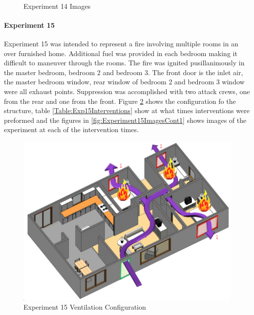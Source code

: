 \documentclass{article}
\begin{document}
\begin{figure}[H]
	\ContinuedFloat 
	\centering 
	 \ 
	\caption{Experiment 14 Images}
	\label{fig:Experiment14ImagesCont3} 
\end{figure}

\paragraph{Experiment 15}\mbox{}

Experiment 15 was intended to represent a fire involving multiple rooms in an over furnished home. Additional fuel was provided in each bedroom making it difficult to maneuver through the rooms. The fire was ignited pusillanimously in the master bedroom, bedroom 2 and bedroom 3. The front door is the inlet air, the master bedroom window, rear window of bedroom 2 and bedroom 3 window were all exhaust points. Suppression was accomplished with two attack crews, one from the rear and one from the front. Figure \ref{fig:Exp15VentConfig} shows the configuration fo the structure, table \ref{Table:Exp15Interventions} show at what times interventions were preformed and the figures in \ref{fig:Experiment15ImagesCont1} shows images of the experiment at each of the intervention times.

\begin{figure}[h!]
	\centering
	\includegraphics[width=5in]{0_Images/FireExperiments/Single_Story/Experiment_15.jpg}
	\caption{Experiment 15 Ventilation Configuration}
	\label{fig:Exp15VentConfig}
\end{figure}
\end{document}
